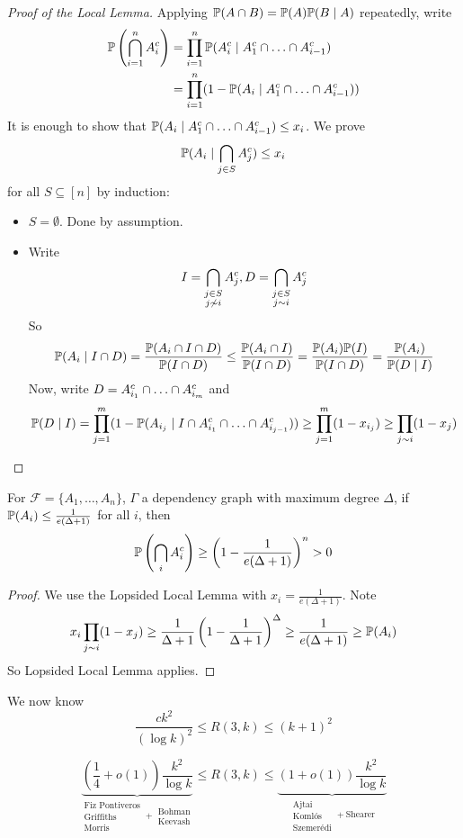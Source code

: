 \documentclass{article}
\begin{document}
\begin{proof}[Proof of the Local Lemma]
  Applying $\P(A \inter B) = \P(A) \P(B \mid A)$ repeatedly, write
  \begin{align*}
    \P\left(\Inter_{i = 1}^n A_i^c\right)
    & = \prod_{i = 1}^n \P(A_i^c \mid A_1^c \inter \dots \inter A_{i - 1}^c) \\
    & = \prod_{i = 1}^n (1 - \P(A_i \mid A_1^c \inter \dots \inter A_{i - 1}^c))
  \end{align*}
  It is enough to show that $\P(A_i \mid A_1^c \inter \dots \inter A_{i - 1}^c) \le x_i$. We prove
  $$\P(A_i \mid \Inter_{j \in S} A_j^c) \le x_i$$
  for all $S \subseteq [n]$ by induction:
  \begin{itemize}
    \item $S = \emptyset$. Done by assumption.
    \item Write
    $$I = \Inter_{\substack{j \in S \\ j \not\sim i}} A_j^c, D = \Inter_{\substack{j \in S \\ j \sim i}} A_j^c$$
    So
    $$\P(A_i \mid I \inter D) = \frac{\P(A_i \inter I \inter D)}{\P(I \inter D)} \le \frac{\P(A_i \inter I)}{\P(I \inter D)} = \frac{\P(A_i)\P(I)}{\P(I \inter D)} = \frac{\P(A_i)}{\P(D \mid I)}$$
    Now, write $D = A_{i_1}^c \inter \dots \inter A_{i_m}^c$ and
    $$\P(D \mid I) = \prod_{j = 1}^m (1 - \P(A_{i_j} \mid I \inter A_{i_1}^c \inter \dots \inter A_{i_{j - 1}}^c)) \ge \prod_{j = 1}^m (1 - x_{i_j}) \ge \prod_{j \sim i} (1 - x_j)$$
  \end{itemize}
\end{proof}

\begin{thm}
  For $\mathcal F = \{A_1, \dots, A_n\}$, $\Gamma$ a dependency graph with maximum degree $\Delta$, if $\P(A_i) \le \frac 1{e(\Delta + 1)}$ for all $i$, then
  $$\P\left(\Inter_i A_i^c\right) \ge \left(1 - \frac 1{e(\Delta + 1)}\right)^n > 0$$
\end{thm}
\begin{proof}
  We use the Lopsided Local Lemma with $x_i = \frac 1{e(\Delta + 1)}$. Note
  $$x_i \prod_{j \sim i} (1 - x_j) \ge \frac 1{\Delta + 1}\left(1 - \frac 1{\Delta + 1}\right)^\Delta \ge \frac 1{e(\Delta + 1)} \ge \P(A_i)$$
  So Lopsided Local Lemma applies.
\end{proof}

We now know
$$\frac{ck^2}{(\log k)^2} \le R(3, k) \le (k + 1)^2$$

\begin{thm}
  $$\underbrace{\left(\frac 14 + o(1)\right)\frac{k^2}{\log k}}_{\substack{\text{Fiz Pontiveros} \\ \text{Griffiths} \\ \text{Morris}} + \substack{\text{Bohman} \\ \text{Keevash}}} \le R(3, k) \le \underbrace{(1 + o(1))\frac{k^2}{\log k}}_{\substack{\text{Ajtai} \\ \text{Komlós} \\ \text{Szemerédi}} + \text{Shearer}}$$
\end{thm}
\end{document}
